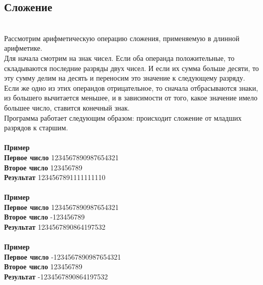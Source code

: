 \documentclass[a4paper]{article}
\begin{document}
\subsection{Сложение}
\\Рассмотрим арифметическую операцию сложения, применяемую в длинной арифметике.
\\Для начала смотрим на знак чисел. Если оба операнда положительные, то складываются последние разряды двух чисел. И если их сумма больше десяти, то эту сумму делим на десять и переносим это значение к следующему разряду.
\\Если же одно из этих операндов отрицательное, то сначала отбрасываются знаки, из большего вычитается меньшее, и в зависимости от того, какое значение имело большее число, ставится конечный знак.
\\Программа работает следующим образом: происходит сложение от младших разрядов к старшим.
\\
\\ \textbf{Пример}
\\ \textbf{Первое число} 1234567890987654321
\\ \textbf{Второе число} 123456789
\\ \textbf{Результат} 1234567891111111110
\\
\\ \textbf{Пример}
\\ \textbf{Первое число} 1234567890987654321
\\ \textbf{Второе число} -123456789
\\ \textbf{Результат} 1234567890864197532
\\
\\ \textbf{Пример}
\\ \textbf{Первое число} -1234567890987654321
\\ \textbf{Второе число} 123456789
\\ \textbf{Результат} -1234567890864197532
\end{document}
